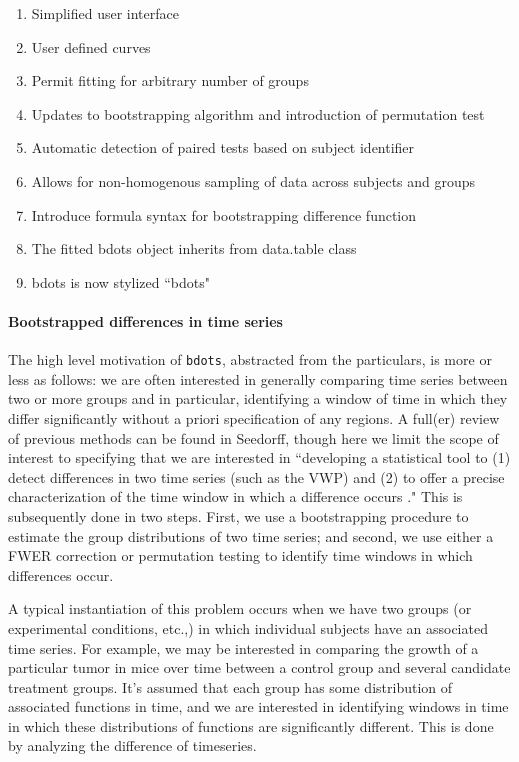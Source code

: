 \documentclass{article}
\newcommand{\xt}{\texttt}%
\begin{document}
\begin{singlespace}
\begin{enumerate}
\item Simplified user interface
\item User defined curves
\item Permit fitting for arbitrary number of groups
\item Updates to bootstrapping algorithm and introduction of permutation test
\item Automatic detection of paired tests based on subject identifier
\item Allows for non-homogenous sampling of data across subjects and groups
\item Introduce formula syntax for bootstrapping difference function
\item The fitted bdots object inherits from data.table class
\item bdots is now stylized ``bdots"
\end{enumerate}
\end{singlespace}

\paragraph{Bootstrapped differences in time series}

The high level motivation of \xt{bdots}, abstracted from the particulars, is more or less as follows: we are often interested in generally comparing time series between two or more groups and in particular, identifying a window of time in which they differ significantly without a priori specification of any regions. A full(er) review of previous methods can be found in Seedorff, though here we limit the scope of interest to specifying that we are interested in ``developing a statistical tool to (1) detect differences in two time series (such as the VWP) and (2) to offer a precise characterization of the time window in which a difference occurs \cite{seedorff2018bdots}." This is subsequently done in two steps. First, we use a bootstrapping procedure to estimate the group distributions of two time series; and second, we use either a FWER correction or permutation testing to identify time windows in which differences occur.

A typical instantiation of this problem occurs when we have two groups (or experimental conditions, etc.,) in which individual subjects have an associated time series. For example, we may be interested in comparing the growth of a particular tumor in mice over time between a control group and several candidate treatment groups. It's assumed that each group has some distribution of associated functions in time, and we are interested in identifying windows in time in which these distributions of functions are significantly different. This is done by analyzing the difference of timeseries.
\end{document}
